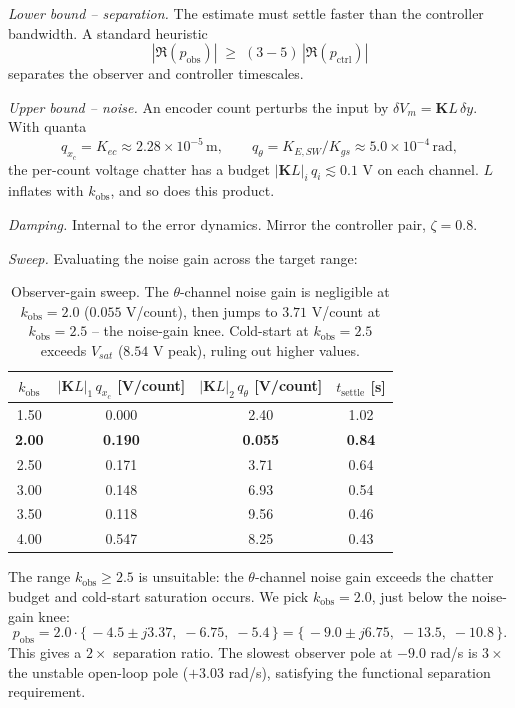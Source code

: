\documentclass[11pt,a4paper]{article}
\begin{document}
\textit{Lower bound -- separation.} The estimate must settle faster than the controller bandwidth. A standard heuristic
\begin{equation}
	|\Re(p_{\mathrm{obs}})| \;\geq\; (3{-}5)\,|\Re(p_{\mathrm{ctrl}})|
\end{equation}
separates the observer and controller timescales.

\textit{Upper bound -- noise.} An encoder count perturbs the input by $\delta V_m = \mathbf{K} L\,\delta y$. With quanta
\begin{equation}
	q_{x_c} = K_{ec} \approx 2.28\times 10^{-5}\,\text{m},
	\qquad q_\theta = K_{E,SW}/K_{gs} \approx 5.0\times 10^{-4}\,\text{rad},
\end{equation}
the per-count voltage chatter has a budget $|\mathbf{K} L|_i\,q_i \lesssim 0.1$ V on each channel. $L$ inflates with $k_{\mathrm{obs}}$, and so does this product.

\textit{Damping.} Internal to the error dynamics. Mirror the controller pair, $\zeta = 0.8$.

\textit{Sweep.} Evaluating the noise gain across the target range:
\begin{table}[H]
	\centering
	\begin{tabular}{c|cc|c}
		\hline
		\rowcolor{bluePoli!40}
		$k_{\mathrm{obs}}$ & $|\mathbf{K}L|_1\,q_{x_c}$ [V/count] & $|\mathbf{K}L|_2\,q_\theta$ [V/count] & $t_{\mathrm{settle}}$ [s] \T\B \\
		\hline
		\hline
		1.50 & 0.000 & 2.40 & 1.02 \T\\
		\textbf{2.00} & \textbf{0.190} & \textbf{0.055} & \textbf{0.84} \\
		2.50 & 0.171 & 3.71 & 0.64 \\
		3.00 & 0.148 & 6.93 & 0.54 \\
		3.50 & 0.118 & 9.56 & 0.46 \\
		4.00 & 0.547 & 8.25 & 0.43 \B\\
		\hline
	\end{tabular}
	\caption{Observer-gain sweep. The $\theta$-channel noise gain is negligible at $k_{\mathrm{obs}} = 2.0$ ($0.055$ V/count), then jumps to $3.71$ V/count at $k_{\mathrm{obs}} = 2.5$ -- the noise-gain knee. Cold-start at $k_{\mathrm{obs}} = 2.5$ exceeds $V_{sat}$ ($8.54$ V peak), ruling out higher values.}
	\label{table:kobs_sweep}
\end{table}

The range $k_{\mathrm{obs}} \geq 2.5$ is unsuitable: the $\theta$-channel noise gain exceeds the chatter budget and cold-start saturation occurs. We pick $k_{\mathrm{obs}} = 2.0$, just below the noise-gain knee:
\begin{equation}
	p_{\mathrm{obs}} = 2.0 \cdot \{\,-4.5 \pm j3.37,\; -6.75,\; -5.4\,\} = \{\,-9.0 \pm j6.75,\; -13.5,\; -10.8\,\}.
\end{equation}
This gives a $2\times$ separation ratio. The slowest observer pole at $-9.0$ rad/s is $3\times$ the unstable open-loop pole ($+3.03$ rad/s), satisfying the functional separation requirement.
\end{document}
